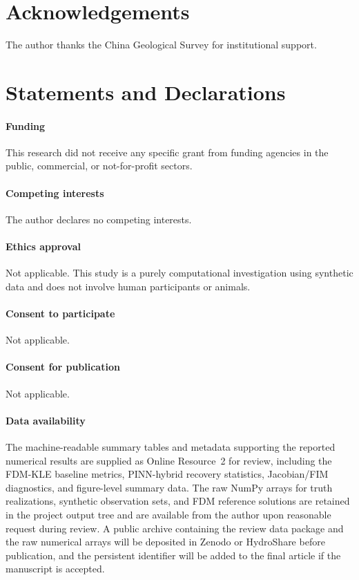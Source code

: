 \documentclass[pdflatex,sn-mathphys,Numbered,iicol]{sn-jnl}
\begin{document}
\backmatter

\section*{Acknowledgements}
The author thanks the China Geological Survey for institutional support.

\section*{Statements and Declarations}

\paragraph{Funding} This research did not receive any specific grant from funding agencies in the public, commercial, or not-for-profit sectors.

\paragraph{Competing interests} The author declares no competing interests.

\paragraph{Ethics approval} Not applicable. This study is a purely computational investigation using synthetic data and does not involve human participants or animals.

\paragraph{Consent to participate} Not applicable.

\paragraph{Consent for publication} Not applicable.

\paragraph{Data availability} The machine-readable summary tables and metadata
supporting the reported numerical results are supplied as Online Resource~2
for review, including the FDM-KLE baseline metrics, PINN-hybrid recovery
statistics, Jacobian/FIM diagnostics, and figure-level summary data. The raw
NumPy arrays for truth realizations, synthetic observation sets, and FDM
reference solutions are retained in the project output tree and are available
from the author upon reasonable request during review. A public
archive containing the review data package and the raw numerical arrays will be
deposited in Zenodo or HydroShare before publication, and the persistent
identifier will be added to the final article if the manuscript is accepted.
\end{document}
